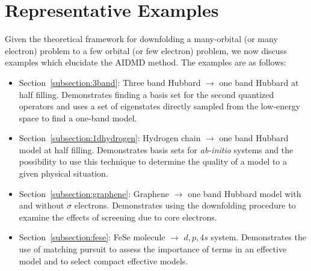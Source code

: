 \section{Representative Examples}

Given the theoretical framework for downfolding a many-orbital (or many electron) problem to a 
few orbital (or few electron) problem, we now discuss examples which elucidate the 
AIDMD method. 
The examples are as follows:
\begin{itemize}
\item Section~\ref{subsection:3band}: Three band Hubbard $\rightarrow$ one band Hubbard at half filling. Demonstrates finding a basis set for the second quantized operators and uses a set of eigenstates directly sampled from the low-energy space to find a one-band model.
\item Section~\ref{subsection:1dhydrogen}: Hydrogen chain $\rightarrow$ one band Hubbard model at half filling. Demonstrates basis sets for {\it ab-initio} systems and the possibility to use this technique to determine the quality of a model to a given physical situation.
\item Section~\ref{subsection:graphene}: Graphene $\rightarrow$ one band Hubbard model with and without $\sigma$ electrons. Demonstrates using the downfolding procedure to examine the effects of screening due to core electrons. 
\item Section~\ref{subsection:fese}: FeSe molecule $\rightarrow$ $d,p,4s$ system. Demonstrates the use of matching pursuit to assess the importance of terms in an effective model and to select compact effective models.
\end{itemize}

